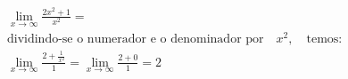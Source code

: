 \begin{ex}
\begin{align}
&\lim_{x\rightarrow \infty} \frac{2x^2+1}{x^2}=\nonumber\\
&\text{dividindo-se o numerador e o denominador por}\quad{x^2},\quad\text{temos:}\nonumber\\
&\lim_{x\rightarrow \infty} \frac{2+\frac{1}{x^2}}{1}=\lim_{x\rightarrow \infty} \frac{2+0}{1}=2\nonumber
\end{align}
\end{ex}
